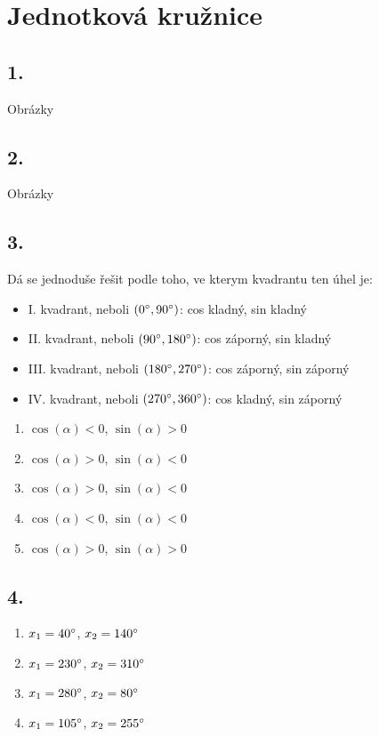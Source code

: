 \documentclass[a4paper,11pi]{article}
\begin{document}
	
	\section*{Jednotková kružnice}
		
		\subsection*{1.}
		
			Obrázky
			
		\subsection*{2.}
			
			Obrázky
			
		\subsection*{3.}
			
			Dá se jednoduše řešit podle toho, ve kterym kvadrantu ten úhel je:
			\begin{itemize}
				\item I. kvadrant, neboli $(0\degree,90\degree)$: cos kladný, sin kladný
				\item II. kvadrant, neboli $(90\degree,180\degree)$: cos záporný, sin kladný
				\item III. kvadrant, neboli $(180\degree,270\degree)$: cos záporný, sin záporný
				\item IV. kvadrant, neboli $(270\degree,360\degree)$: cos kladný, sin záporný
			\end{itemize}
			\begin{enumerate}[label=(\alph*)]
				\item $\cos(\alpha) < 0$, $\sin(\alpha) > 0$
				\item $\cos(\alpha) > 0$, $\sin(\alpha) < 0$
				\item $\cos(\alpha) > 0$, $\sin(\alpha) < 0$
				\item $\cos(\alpha) < 0$, $\sin(\alpha) < 0$
				\item $\cos(\alpha) > 0$, $\sin(\alpha) > 0$
			\end{enumerate}
		
		\subsection*{4.}
			
			\begin{enumerate}[label=(\alph*)]
				\item $x_1=40\degree$, $x_2=140\degree$
				\item $x_1=230\degree$, $x_2=310\degree$
				\item $x_1=280\degree$, $x_2=80\degree$
				\item $x_1=105\degree$, $x_2=255\degree$
			\end{enumerate}
		
\end{document}
